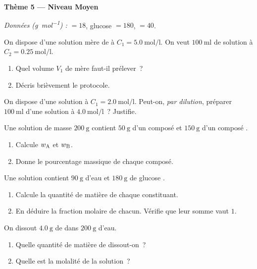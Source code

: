 \documentclass[11pt,a4paper]{article}
\begin{document}
\begin{center}{\large\bfseries\color{primarydark} Thème 5 — Niveau Moyen}\end{center}
\emph{Données (\si{\gram\per\mole}) :} $=18$, glucose $=180$, $=40$.

\begin{exo}
On dispose d'une solution mère de  à $C_1 = \SI{5.0}{\mole\per\litre}$. On veut
$\SI{100}{\milli\litre}$ de solution à $C_2 = \SI{0.25}{\mole\per\litre}$.
\begin{enumerate}[label=\alph*)]
  \item Quel volume $V_1$ de mère faut-il prélever~?
  \item Décris brièvement le protocole.
\end{enumerate}
\end{exo}

\begin{exo}
On dispose d'une solution à $C_1 = \SI{2.0}{\mole\per\litre}$. Peut-on, \emph{par dilution}, préparer
$\SI{100}{\milli\litre}$ d'une solution à $\SI{4.0}{\mole\per\litre}$~? Justifie.
\end{exo}

\begin{exo}
Une solution de masse $\SI{200}{\gram}$ contient $\SI{50}{\gram}$ d'un composé  et
$\SI{150}{\gram}$ d'un composé .
\begin{enumerate}[label=\alph*)]
  \item Calcule $w_{\ce{A}}$ et $w_{\ce{B}}$.
  \item Donne le pourcentage massique de chaque composé.
\end{enumerate}
\end{exo}

\begin{exo}
Une solution contient $\SI{90}{\gram}$ d'eau  et $\SI{180}{\gram}$ de glucose .
\begin{enumerate}[label=\alph*)]
  \item Calcule la quantité de matière de chaque constituant.
  \item En déduire la fraction molaire de chacun. Vérifie que leur somme vaut $1$.
\end{enumerate}
\end{exo}

\begin{exo}
On dissout $\SI{4.0}{\gram}$ de  dans $\SI{200}{\gram}$ d'eau.
\begin{enumerate}[label=\alph*)]
  \item Quelle quantité de matière de  dissout-on~?
  \item Quelle est la molalité de la solution~?
\end{enumerate}
\end{exo}
\end{document}
